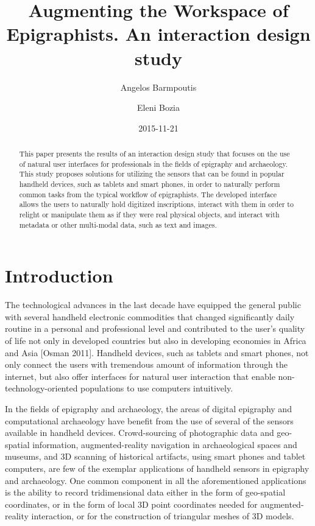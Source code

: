 \documentclass[amsthm,ebook]{saparticle}
\title{Augmenting the Workspace of Epigraphists.
An interaction design study}
\author[1]{Angelos Barmpoutis\corref{first}}
\author[2]{Eleni Bozia}
\date{2015-11-21}
\begin{document}
\maketitle
\begin{abstract}
This paper presents the results of an interaction design study that focuses on the use of natural user
interfaces for professionals in the fields of epigraphy and archaeology. This study proposes solutions for utilizing
the sensors that can be found in popular handheld devices, such as tablets and smart phones, in order to naturally
perform common tasks from the typical workflow of epigraphists. The developed interface allows the users to naturally
hold digitized inscriptions, interact with them in order to relight or manipulate them as if they were real physical
objects, and interact with metadata or other multi-modal data, such as text and images. 
\end{abstract}

\section{Introduction}


\noindent The technological advances in the last decade have equipped the general public with several handheld electronic
commodities that changed significantly daily routine in a personal and professional level and contributed to the user's
quality of life not only in developed countries but also in developing economies in Africa and Asia [Osman 2011].
Handheld devices, such as tablets and smart phones, not only connect the users with tremendous amount of information
through the internet, but also offer interfaces for natural user interaction that enable non-technology-oriented
populations to use computers intuitively.

In the fields of epigraphy and archaeology, the areas of digital epigraphy and computational archaeology have benefit
from the use of several of the sensors available in handheld devices. Crowd-sourcing of photographic data and
geo-spatial information, augmented-reality navigation in archaeological spaces and museums, and 3D scanning of
historical artifacts, using smart phones and tablet computers, are few of the exemplar applications of handheld
sensors in epigraphy and archaeology. One common component in all the aforementioned applications is the ability to
record tridimensional data either in the form of geo-spatial coordinates, or in the form of local 3D point coordinates
needed for augmented-reality interaction, or for the construction of triangular meshes of 3D models. 
\end{document}
